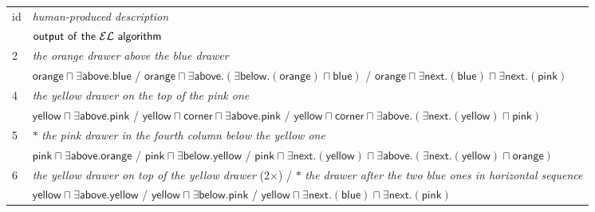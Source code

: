 

\begin{figure*}[thb]

\begin{footnotesize}
\begin{tabular}{|l|p{}|}\hline
\multirow{2}{*}{id} & \textit{human-produced description} \\
& $\mathsf{output\ of\ the\ \el\ algorithm}$\\\hline
\multirow{2}{*}{2} & \textit{the orange drawer above the blue drawer} \\
&  $\bm{\mathsf{orange} \sqcap \exists \mathsf{above}.\mathsf{blue}}$ / $\mathsf{orange} \sqcap \exists \mathsf{above}.(\exists \mathsf{below}.(\mathsf{orange}) \sqcap \mathsf{blue})$ / $ \mathsf{orange} \sqcap \exists \mathsf{next}.(\mathsf{blue}) \sqcap \exists \mathsf{next}.(\mathsf{pink})$\\\hline
\multirow{2}{*}{4} & \textit{the yellow drawer on the top of the pink one} \\ 
&  $\bm{\mathsf{yellow} \sqcap \exists \mathsf{above}.\mathsf{pink}}$  / $\mathsf{yellow}  \sqcap \mathsf{corner} \sqcap \exists \mathsf{above}.\mathsf{pink}$  / $\mathsf{yellow} \sqcap \mathsf{corner} \sqcap \exists \mathsf{above}.(\exists \mathsf{next}.(\mathsf{yellow}) \sqcap \mathsf{pink})$\\\hline
\multirow{2}{*}{5} & $\ast$ \textit{the pink drawer in the fourth column below the yellow one}\\
&  $\mathsf{pink} \sqcap \exists \mathsf{above}.\mathsf{orange}$  / $\mathsf{pink} \sqcap \exists \mathsf{below}.\mathsf{yellow}$  / $ \mathsf{pink} \sqcap \exists \mathsf{next}.(\mathsf{yellow}) \sqcap \exists \mathsf{above}.(\exists \mathsf{next}.(\mathsf{yellow}) \sqcap \mathsf{orange})$\\\hline
\multirow{2}{*}{6} & \textit{the yellow drawer on top of the yellow drawer} (2$\times$) / $\ast$ \textit{the drawer after the two blue ones in horizontal sequence}\\
&  $\bm{\mathsf{yellow} \sqcap \exists \mathsf{above}.\mathsf{yellow}}$  / $\mathsf{yellow} \sqcap \exists \mathsf{below}.\mathsf{pink}$  / $\mathsf{yellow} \sqcap \exists \mathsf{next}.(\mathsf{blue}) \sqcap \exists \mathsf{next}.(\mathsf{pink})$\\\hline

\end{tabular}
\end{footnotesize}
\end{figure*}
